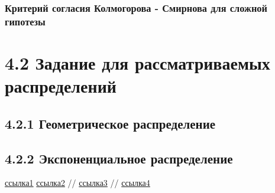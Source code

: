 \documentclass[a4paper,12pt, oneside]{book}
\begin{document}
\subsection{Критерий согласия Колмогорова - Смирнова для сложной гипотезы}







\chapter{4.2 Задание для рассматриваемых распределений}

\section{4.2.1 Геометрическое распределение}

\section{4.2.2 Экспоненциальное распределение}







\begin{thebibliography}{99}
	 \href{https://towardsdatascience.com/what-is-exponential-distribution-7bdd08590e2a}{ссылка1}
	  \href{https://www.statisticshowto.datasciencecentral.com/exponential-distribution/}{ссылка2}
	  // \href{http://www.ams.jhu.edu/~dan/550.435/notes/COURSENOTES435.pdf}{ссылка3}
	  // \href{http://www.obzh.ru/nad/4-3.html}{ссылка4}
\end{thebibliography}
\end{document}
